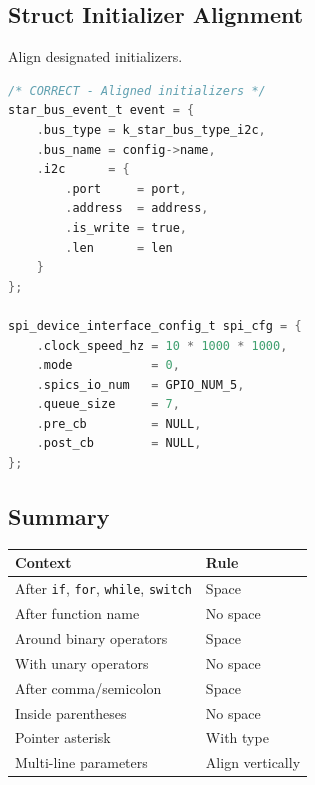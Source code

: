 \subsection{Struct Initializer Alignment}

Align designated initializers.

\begin{lstlisting}[language=C]
/* CORRECT - Aligned initializers */
star_bus_event_t event = {
    .bus_type = k_star_bus_type_i2c,
    .bus_name = config->name,
    .i2c      = {
        .port     = port,
        .address  = address,
        .is_write = true,
        .len      = len
    }
};

spi_device_interface_config_t spi_cfg = {
    .clock_speed_hz = 10 * 1000 * 1000,
    .mode           = 0,
    .spics_io_num   = GPIO_NUM_5,
    .queue_size     = 7,
    .pre_cb         = NULL,
    .post_cb        = NULL,
};
\end{lstlisting}

\subsection{Summary}

\begin{center}
\begin{tabular}{|l|l|}
\hline
\textbf{Context} & \textbf{Rule} \\
\hline
After \texttt{if}, \texttt{for}, \texttt{while}, \texttt{switch} & Space \\
\hline
After function name & No space \\
\hline
Around binary operators & Space \\
\hline
With unary operators & No space \\
\hline
After comma/semicolon & Space \\
\hline
Inside parentheses & No space \\
\hline
Pointer asterisk & With type \\
\hline
Multi-line parameters & Align vertically \\
\hline
\end{tabular}
\end{center}

